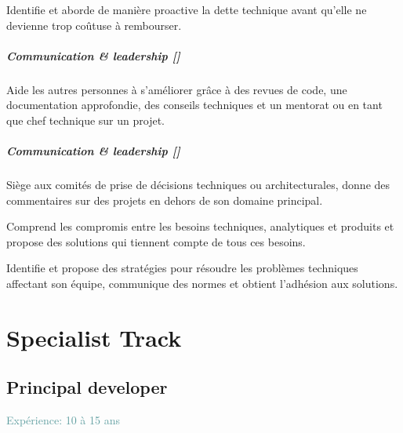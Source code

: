 \documentclass[a4paper, french, openany, 12pt]{book}
\newcommand\cha{\textcolor{RawSienna}{\textbf{Communication \& leadership [\bsc{CHA}]}}}
\newcommand\xp[1]{\textcolor{CadetBlue}{Expérience: {#1} ans}}
\begin{document}
\begin{multicols}{2}
  Identifie et aborde de manière proactive la dette technique avant qu'elle ne devienne trop coûtuse à rembourser.

  \subsubsection*{\cha}

  Aide les autres personnes à s'améliorer grâce à des revues de code, une documentation approfondie, des conseils 
  techniques et un mentorat ou en tant que chef technique sur un projet.

  \subsubsection*{\cha}
  Siège aux comités de prise de décisions techniques ou architecturales, donne des commentaires sur des projets en dehors 
  de son domaine principal.

  Comprend les compromis entre les besoins techniques, analytiques et produits et propose des solutions qui tiennent 
  compte de tous ces besoins.

  Identifie et propose des stratégies pour résoudre les problèmes techniques affectant son équipe, communique des normes 
  et obtient l'adhésion aux solutions.

\end{multicols}

\part{Specialist Track}

\chapter{Principal developer}

\xp{10 à 15}
\end{document}
